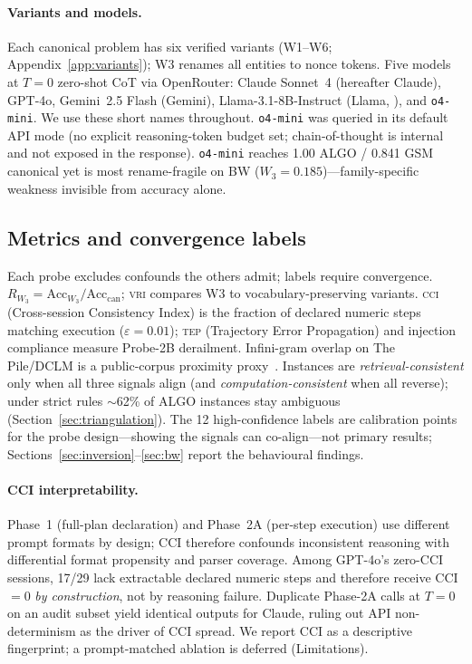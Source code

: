 \documentclass{article}
\newcommand{\omini}{\texttt{o4-mini}}     %
\newcommand{\wthree}{\ensuremath{W_3}}
\newcommand{\Rwiii}{\ensuremath{R_{W_3}}}
\newcommand{\eps}{\varepsilon}
\newcommand{\cci}{\textsc{cci}}
\newcommand{\tep}{\textsc{tep}}
\newcommand{\vri}{\textsc{vri}}
\begin{document}
\paragraph{Variants and models.}
Each canonical problem has six verified variants (W1--W6;
Appendix~\ref{app:variants}); W3 renames all entities to nonce tokens. Five
models at $T{=}0$ zero-shot CoT via OpenRouter: Claude Sonnet~4 (hereafter
Claude), GPT-4o, Gemini~2.5 Flash (Gemini), Llama-3.1-8B-Instruct (Llama,
\citealp{dubey2024llama}), and \omini. We use these short names throughout.
\omini{} was queried in its default API mode (no explicit
reasoning-token budget set; chain-of-thought is internal and not exposed in
the response). \omini{} reaches 1.00 ALGO / 0.841 GSM canonical yet is most
rename-fragile on BW (\wthree{}${=}0.185$)---family-specific weakness
invisible from accuracy alone.

\subsection{Metrics and convergence labels}
\label{sec:metrics}

Each probe excludes confounds the others admit; labels require convergence.
$\Rwiii{=}\mathrm{Acc}_{W_3}/\mathrm{Acc}_{\mathrm{can}}$; \vri{} compares
W3 to vocabulary-preserving variants. \cci{} (Cross-session Consistency
Index) is the fraction of declared numeric steps matching execution
($\eps{=}0.01$); \tep{} (Trajectory Error Propagation) and injection
compliance measure Probe-2B derailment. Infini-gram overlap on The
Pile/DCLM is a public-corpus proximity proxy~\citep{liu2024infini}.
Instances are \emph{retrieval-consistent} only when all three signals align
(and \emph{computation-consistent} when all reverse); under strict rules
$\sim$62\% of ALGO instances stay ambiguous (Section~\ref{sec:triangulation}).
The 12 high-confidence labels are calibration points for the probe
design---showing the signals can co-align---not primary results;
Sections~\ref{sec:inversion}--\ref{sec:bw} report the behavioural findings.

\paragraph{CCI interpretability.}
Phase~1 (full-plan declaration) and Phase~2A (per-step execution) use
different prompt formats by design; CCI therefore confounds inconsistent
reasoning with differential format propensity and parser coverage. Among
GPT-4o's zero-CCI sessions, 17/29 lack extractable declared numeric steps and
therefore receive CCI${=}0$ \emph{by construction}, not by reasoning failure.
Duplicate Phase-2A calls at $T{=}0$ on an audit subset yield identical
outputs for Claude, ruling out API non-determinism as the driver of CCI
spread. We report CCI as a descriptive fingerprint; a prompt-matched ablation
is deferred (Limitations).
\end{document}
